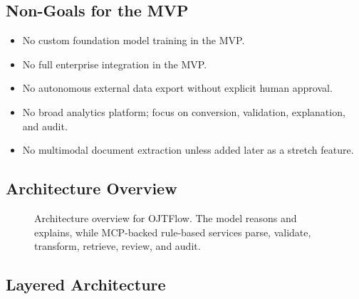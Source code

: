 \subsection{Non-Goals for the MVP}

\begin{itemize}
  \item No custom foundation model training in the MVP.
  \item No full enterprise integration in the MVP.
  \item No autonomous external data export without explicit human approval.
  \item No broad analytics platform; focus on conversion, validation, explanation, and audit.
  \item No multimodal document extraction unless added later as a stretch feature.
\end{itemize}

\subsection{Architecture Overview}

\begin{figure}[H]
  \centering
  
  \caption{Architecture overview for OJTFlow. The model reasons and explains, while MCP-backed rule-based services parse, validate, transform, retrieve, review, and audit.}
  \label{fig:architecture}
\end{figure}

\subsection{Layered Architecture}

